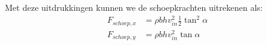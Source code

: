 \begin{voorbeeld}
	Met deze uitdrukkingen kunnen we de schoepkrachten uitrekenen als:
	\begin{align*}
		F_{schoep,x} &= \rho b h  v^2_{in} \frac{1}{2} \tan^2 \alpha \\
		F_{schoep,y} &= \rho b h v_{in}^2 \tan \alpha
	\end{align*}
\end{voorbeeld}
